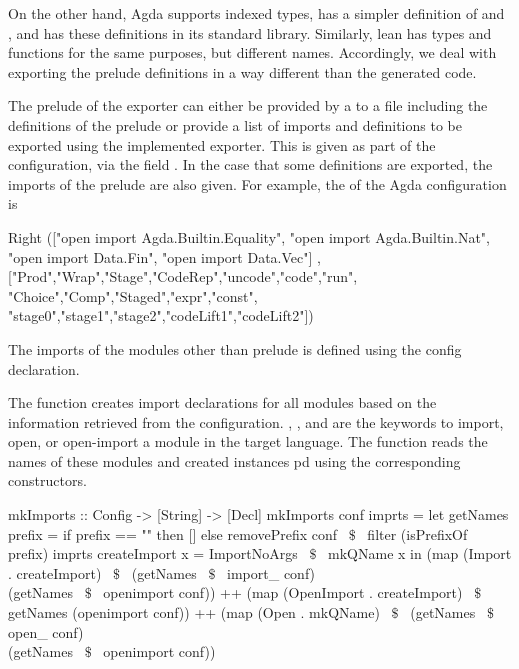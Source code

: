 On the other hand, Agda supports indexed types, has a simpler definition of  and , and has these definitions in its standard library. Similarly, lean has types and functions for the same purposes, but different names. Accordingly, we deal with exporting the prelude definitions in a way different than the generated code. 

The prelude of the exporter can either be provided by a  to a file including the definitions of the prelude or provide a list of imports and definitions to be exported using the implemented exporter. This is given as part of the configuration, via the field
. In the case that some definitions are exported, the imports of the prelude are also given. 
For example, the  of the Agda configuration is 
\begin{hscode} 
 Right (["open import Agda.Builtin.Equality",
         "open import Agda.Builtin.Nat",
         "open import Data.Fin",
         "open import Data.Vec"]
      ,["Prod","Wrap","Stage","CodeRep","uncode","code","run",
        "Choice","Comp","Staged","expr","const",
        "stage0","stage1","stage2","codeLift1","codeLift2"])   
\end{hscode} 

The imports of the modules other than prelude is defined using the  config declaration. 

The function  creates import declarations for all modules based on the information retrieved from the configuration. , , and  are the keywords to import, open, or open-import a module in the target language. The function reads the names of these modules and created instances pd  using the corresponding constructors. 
\begin{hscode}
mkImports :: Config -> [String] -> [Decl]
mkImports conf imprts =
  let getNames prefix =
        if prefix == "" then [] 
        else removePrefix conf ~$\$$~ filter (isPrefixOf prefix) imprts
       createImport x = ImportNoArgs ~$\$$~ mkQName x
  in (map (Import . createImport) ~$\$$~ 
         (getNames ~$\$$~ import_ conf) \\ (getNames ~$\$$~ openimport conf))
  ++ (map (OpenImport . createImport) ~$\$$~ getNames (openimport conf))
  ++ (map (Open . mkQName) ~$\$$~
         (getNames ~$\$$~ open_ conf) \\ (getNames ~$\$$~ openimport conf))
\end{hscode} 

